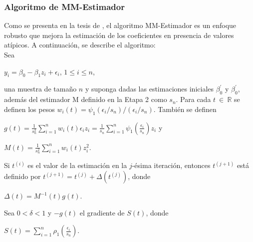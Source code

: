 \subsubsection{ Algoritmo de MM-Estimador \parencite{zacarias-2023} }
Como se presenta en la tesis de \textcite{zacarias-2023}, el algoritmo MM-Estimador es un enfoque robusto que mejora la estimación de los coeficientes en presencia de valores atípicos. A continuación, se describe el algoritmo:\\

Sea\\
\begin{center}
 $ y_{i} = \beta_{0} -\beta_{1}z_{i} + \epsilon_{i} $, $1 \leq i \leq n $,\\
\end{center}

una muestra de tamaño $n$ y suponga dadas las estimaciones iniciales $\beta_{0}^{'}$ y $\beta_{0}^{'}$, además del estimador M definido en la Etapa 2 como $s_{n}$. Para cada $t \: \in  \: \mathbb{R} $ se definen los pesos
$w_{i}(t) = \psi_{1} (\epsilon_{i} /s_{n}) /(\epsilon_{i} /s_{n})$. También se definen \\


\begin{center}
	{\large $g(t) = \frac{1}{s_{n}^{2}} \sum_{i=1}^{n} w_{i}( t )\epsilon_{i} z_{i} =  \frac{1}{s_{n}}  \sum_{i=1}^{n} \psi_{1} (\frac{\epsilon_{i}}{s_{n}}) z_{i}$} y \\	
\end{center}

\begin{center}
	{\large$ M(t) = \frac{1}{s_{n}^{2}}  \sum_{i=1}^{n}  w_{i}( t ) z_{i}^{2} $}.\\
\end{center}





Si $t^{(i)}$ es el valor de la estimación en la $j$-ésima iteración, entonces $t^{(j+1)}$ está definido por $t^{(j+1)} = t^{(j)} + \Delta ( t^{(j)})$, donde \\

\begin{center}
	$\Delta ( t) = M^{-1}(t)g(t)$.\\
\end{center}

Sea $0< \delta  < 1$  y $-g(t)$ el gradiente de $S(t)$, donde \\

\begin{center}
	{\large $S(t) = \sum_{i=1}^{n} \rho_{1} ( \frac{\epsilon_{i}}{s_{n}})$}. \\
\end{center}


